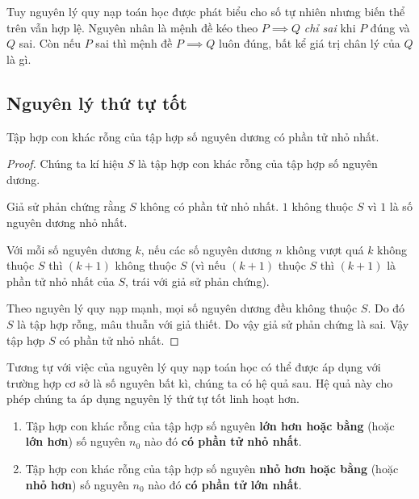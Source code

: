 Tuy nguyên lý quy nạp toán học được phát biểu cho số tự nhiên nhưng biến thể trên vẫn hợp lệ. Nguyên nhân là mệnh đề kéo theo $P\implies Q$ \textit{chỉ sai} khi $P$ đúng và $Q$ sai. Còn nếu $P$ sai thì mệnh đề $P\implies Q$ luôn đúng, bất kể giá trị chân lý của $Q$ là gì.

\begin{theorem}
\end{theorem}

\subsection{Nguyên lý thứ tự tốt}

\begin{theorem}
    Tập hợp con khác rỗng của tập hợp số nguyên dương có phần tử nhỏ nhất.
\end{theorem}

\begin{proof}
    Chúng ta kí hiệu $S$ là tập hợp con khác rỗng của tập hợp số nguyên dương.

    Giả sử phản chứng rằng $S$ không có phần tử nhỏ nhất. $1$ không thuộc $S$ vì $1$ là số nguyên dương nhỏ nhất.

    Với mỗi số nguyên dương $k$, nếu các số nguyên dương $n$ không vượt quá $k$ không thuộc $S$ thì $(k+1)$ không thuộc $S$ (vì nếu $(k+1)$ thuộc $S$ thì $(k+1)$ là phần tử nhỏ nhất của $S$, trái với giả sử phản chứng).

    Theo nguyên lý quy nạp mạnh, mọi số nguyên dương đều không thuộc $S$. Do đó $S$ là tập hợp rỗng, mâu thuẫn với giả thiết. Do vậy giả sử phản chứng là sai. Vậy tập hợp $S$ có phần tử nhỏ nhất.
\end{proof}

Tương tự với việc của nguyên lý quy nạp toán học có thể được áp dụng với trường hợp cơ sở là số nguyên bất kì, chúng ta có hệ quả sau. Hệ quả này cho phép chúng ta áp dụng nguyên lý thứ tự tốt linh hoạt hơn.
\begin{corollary}
    \begin{enumerate}[label={(\roman*)}]
        \item Tập hợp con khác rỗng của tập hợp số nguyên \textbf{lớn hơn hoặc bằng} (hoặc \textbf{lớn hơn}) số nguyên $n_{0}$ nào đó \textbf{có phần tử nhỏ nhất}.
        \item Tập hợp con khác rỗng của tập hợp số nguyên \textbf{nhỏ hơn hoặc bằng} (hoặc \textbf{nhỏ hơn}) số nguyên $n_{0}$ nào đó \textbf{có phần tử lớn nhất}.
    \end{enumerate}
\end{corollary}

